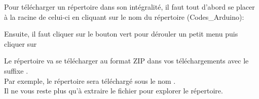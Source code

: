 Pour télécharger un répertoire dans son intégralité, il faut tout d'abord se placer à la racine de celui-ci en cliquant sur le 
nom du répertoire (Codes\_Arduino):


Ensuite, il faut cliquer sur le bouton vert  pour dérouler un petit menu puis cliquer sur 


Le répertoire va se télécharger au format ZIP dans vos téléchargements avec le suffixe .\\ 
Par exemple, le répertoire  sera téléchargé sous le nom .\\

Il ne vous reste plus qu'à extraire le fichier pour explorer le répertoire.

